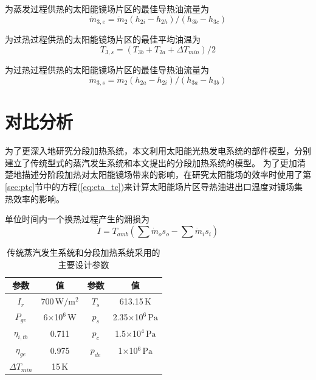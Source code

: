 为蒸发过程供热的太阳能镜场片区的最佳导热油流量为
\begin{equation}
  \dot{m}_{3,e} = \dot{m}_{2}(h_{2i} - h_{2h})/(h_{3b} - h_{3c})
  \label{eq:m_3e}
\end{equation}

为过热过程供热的太阳能镜场片区的最佳平均油温为
\begin{equation}
  T_{3,s} = (T_{3b} + T_{2a} + \Delta T_{min})/2
\end{equation}

为过热过程供热的太阳能镜场片区的最佳导热油流量为
\begin{equation}
  \dot{m}_{3,s} = \dot{m}_{2}(h_{2a} - h_{2i})/(h_{3a} - h_{3b})
\end{equation}

\section{对比分析}

为了更深入地研究分段加热系统，本文利用太阳能光热发电系统的部件模型，分别建立了传统型式的蒸汽发生系统和本文提出的分段加热系统的模型。
为了更加清楚地描述分阶段加热对太阳能镜场带来的影响，在研究太阳能场的效率时使用了第\ref{sec:ptc}节中的方程(\ref{eq:eta_tc})来计算太阳能场片区导热油进出口温度对镜场集热效率的影响。

单位时间内一个换热过程产生的㶲损为
\begin{equation}
  \dot{I} = T_{amb} (\sum \dot{m}_os_o - \sum \dot{m}_is_i)
  \label{eq:dot_I}
\end{equation}

\begin{table}[htbp]
	\caption{传统蒸汽发生系统和分段加热系统采用的主要设计参数}
	\begin{center}
	\begin{tabular}{cccc}
		\toprule
		参数		&	值	&	参数		&	值\\
		\midrule
		$I_r$	&	700$\,\mathrm{W/m^2}$	&	$T_s$		&	613.15$\,\mathrm{K}$\\
		$P_{ge}$	&	6$\times$10$^6\,\mathrm{W}$	&	$p_s$		&	2.35$\times$10$^6\,\mathrm{Pa}$\\
		$\eta_{i,tb}$	&	0.711	&	$p_c$		&	1.5$\times$10$^4\,\mathrm{Pa}$\\
		$\eta_{ge}$	&	0.975	&	$p_{de}$		&	1$\times$10$^6\,\mathrm{Pa}$\\
		$\Delta T_{min}$	&	15$\,\mathrm{K}$	&	&\\		
		\bottomrule
	\end{tabular}
	\end{center}
	\label{tab:ptc}
\end{table}

